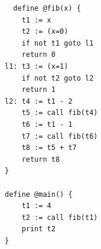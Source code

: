 \documentclass[dvipdfmx]{jarticle}
\begin{document}
\begin{Verbatim}
  define @fib(x) {
    t1 := x
    t2 := (x=0)
    if not t1 goto l1
    return 0
l1: t3 := (x=1)
    if not t2 goto l2
    return 1
l2: t4 := t1 - 2
    t5 := call fib(t4)
    t6 := t1 - 1
    t7 := call fib(t6)
    t8 := t5 + t7
    return t8
}

define @main() {
    t1 := 4
    t2 := call fib(t1)
    print t2
}
\end{Verbatim}
\end{document}
